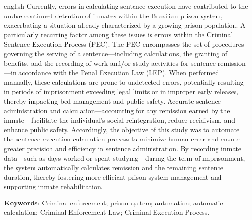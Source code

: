 \begin{resumo}[Abstract]			%
\begin{otherlanguage*}{english}		%
Currently, errors in calculating sentence execution have contributed to the undue continued detention of inmates within the Brazilian prison system, exacerbating a situation already characterized by a growing prison population. A particularly recurring factor among these issues is errors within the Criminal Sentence Execution Process (PEC). The PEC encompasses the set of procedures governing the serving of a sentence—including calculations, the granting of benefits, and the recording of work and/or study activities for sentence remission—in accordance with the Penal Execution Law (LEP). When performed manually, these calculations are prone to undetected errors, potentially resulting in periods of imprisonment exceeding legal limits or in improper early releases, thereby impacting bed management and public safety. Accurate sentence administration and calculation—accounting for any remission earned by the inmate—facilitate the individual's social reintegration, reduce recidivism, and enhance public safety. Accordingly, the objective of this study was to automate the sentence execution calculation process to minimize human error and ensure greater precision and efficiency in sentence administration. By recording inmate data—such as days worked or spent studying—during the term of imprisonment, the system automatically calculates remission and the remaining sentence duration, thereby fostering more efficient prison system management and supporting inmate rehabilitation.
\vspace{\onelineskip}
\noindent

\textbf{Keywords}: Criminal enforcement; prison system; automation; automatic calculation; Criminal Enforcement Law; Criminal Execution Process.
\end{otherlanguage*}
\end{resumo}

% 

%  
